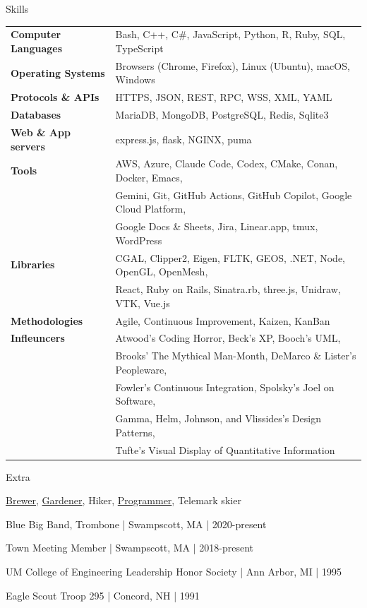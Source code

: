 \documentclass{resume}
\begin{document}
\begin{rSection}{Skills}
\begin{tabular}{ @{} >{\bfseries}l @{\hspace{6ex}} l }
Computer Languages & Bash, C++, C\#, JavaScript, Python, R, Ruby, SQL, TypeScript \\
Operating Systems & Browsers (Chrome, Firefox), Linux (Ubuntu), macOS, Windows \\
Protocols \& APIs & HTTPS, JSON, REST, RPC, WSS, XML, YAML \\
Databases & MariaDB, MongoDB, PostgreSQL, Redis, Sqlite3 \\
Web \& App servers & express.js, flask, NGINX, puma \\
Tools & AWS, Azure, Claude Code, Codex, CMake, Conan, Docker, Emacs, \\
 & Gemini, Git, GitHub Actions, GitHub Copilot, Google Cloud Platform, \\
 & Google Docs \& Sheets, Jira, Linear.app, tmux, WordPress \\
Libraries & CGAL, Clipper2, Eigen, FLTK, GEOS, .NET, Node, OpenGL, OpenMesh, \\
 & React, Ruby on Rails, Sinatra.rb, three.js, Unidraw, VTK, Vue.js \\
Methodologies & Agile, Continuous Improvement, Kaizen, KanBan \\
Infleuncers & Atwood's Coding Horror, Beck's XP, Booch's UML, \\
 & Brooks' The Mythical Man-Month, DeMarco \& Lister's Peopleware, \\
 & Fowler's Continuous Integration, Spolsky's Joel on Software, \\
 & Gamma, Helm, Johnson, and Vlissides's Design Patterns, \\
 & Tufte's Visual Display of Quantitative Information
\end{tabular}
\end{rSection}

\begin{rSection}{Extra}
\item \href{https://48bottles.com}{Brewer}, \href{https://www.tiktok.com/@growherbert}{Gardener}, Hiker, \href{https://github.com/terryg}{Programmer}, Telemark skier
\item Blue Big Band, Trombone | Swampscott, MA | 2020-present
\item Town Meeting Member | Swampscott, MA | 2018-present
\item UM College of Engineering Leadership Honor Society | Ann Arbor, MI | 1995
\item Eagle Scout Troop 295 | Concord, NH | 1991
\end{rSection}
\end{document}
